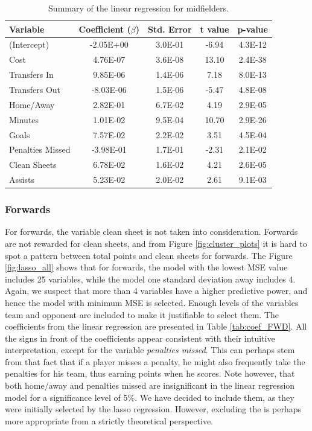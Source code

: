 \begin{table}[H]
\centering
\begin{tabular}{|l|c|c|c|c|}
\hline
Variable         & Coefficient ($\beta$)  & Std. Error & t value & p-value \\ \hline
(Intercept)      & -2.05E+00 & 3.0E-01    & -6.94   & 4.3E-12 \\
Cost             & 4.76E-07  & 3.6E-08    & 13.10   & 2.4E-38 \\
Transfers In     & 9.85E-06  & 1.4E-06    & 7.18    & 8.0E-13 \\
Transfers Out    & -8.03E-06 & 1.5E-06    & -5.47   & 4.8E-08 \\
Home/Away        & 2.82E-01  & 6.7E-02    & 4.19    & 2.9E-05 \\
Minutes          & 1.01E-02  & 9.5E-04    & 10.70   & 2.9E-26 \\
Goals            & 7.57E-02  & 2.2E-02    & 3.51    & 4.5E-04 \\
Penalties Missed & -3.98E-01 & 1.7E-01    & -2.31   & 2.1E-02 \\
Clean Sheets     & 6.78E-02  & 1.6E-02    & 4.21    & 2.6E-05 \\
Assists          & 5.23E-02  & 2.0E-02    & 2.61    & 9.1E-03 \\
\hline
\end{tabular}
\caption{Summary of the linear regression for midfielders.}
\label{tab:coef_MID}
\end{table}


\subsubsection{Forwards}
For forwards, the variable clean sheet is not taken into consideration. Forwards are not rewarded for clean sheets, and from Figure \ref{fig:cluster_plots} it is hard to spot a pattern between total points and clean sheets for forwards. The Figure \ref{fig:lasso_all} shows that for forwards, the model with the lowest MSE value includes 25 variables, while the model one standard deviation away includes 4. Again, we suspect that more than 4 variables have a higher predictive power, and hence the model with minimum MSE is selected. Enough levels of the variables team and opponent are included to make it justifiable to select them. The coefficients from the linear regression are presented in Table \ref{tab:coef_FWD}. All the signs in front of the coefficients appear consistent with their intuitive interpretation, except for the variable \textit{penalties missed}. This can perhaps stem from that fact that if a player misses a penalty, he might also frequently take the penalties for his team, thus earning points when he scores. Note however, that both home/away and penalties missed are insignificant in the linear regression model for a significance level of 5\%. We have decided to include them, as they were initially selected by the lasso regression. However, excluding the is perhaps more appropriate from a strictly theoretical perspective.

